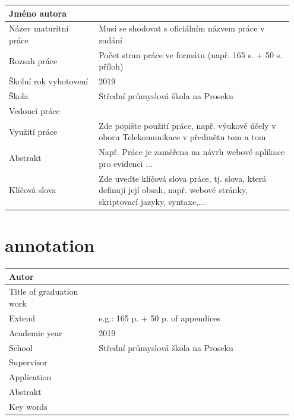 \documentclass[12pt,a4paper]{article} %
\begin{document}
\begin{table}[htb]

	\begin{tabular}{|p{0.3\linewidth}|p{0.65\linewidth}|} \hline
	Jméno autora          & \\ \hline
	Název maturitní práce & {\color{red} Musí se shodovat s oficiálním názvem práce v zadání}										\\ \hline
	Rozsah práce          & {\color{red} Počet stran práce ve formátu (např. 165 s. + 50 s. příloh)}									\\ \hline
	Školní rok vyhotovení & 2019 \\ \hline
	Škola                 & Střední průmyslová škola na Proseku \\ \hline
	Vedoucí práce         & \\ \hline
	Využití práce         & {\color{red} Zde popište použití práce, např. výukové účely v oboru Telekomunikace v předmětu tom a tom}					\\ \hline
	Abstrakt              & {\color{red} Např. Práce je zaměřena na návrh webové aplikace pro evidenci ...} \\ \hline
	Klíčová slova         & {\color{red} Zde uveďte klíčová slova práce, tj. slova, která definují její obsah, např. webové stránky, skriptovací jazyky, syntaxe,...} \\ \hline
	\end{tabular}
\end{table}
\newpage
\section*{annotation}

\begin{table}[htb]
	\begin{tabular}{|p{0.3\linewidth}|p{0.65\linewidth}|} \hline
	Autor                    &							\\ \hline
	Title of graduation work &							\\ \hline
	Extend                   & {\color{red} e.g.: 165 p. + 50 p. of appendices}	\\ \hline
	Academic year            & 2019							\\ \hline
	School                   & Střední průmyslová škola na Proseku			\\ \hline
	Supervisor               &							\\ \hline
	Application              &							\\ \hline
	Abstrakt                 &							\\ \hline
	Key words                &                          \\ \hline 
	\end{tabular}
\end{table}
\end{document}
